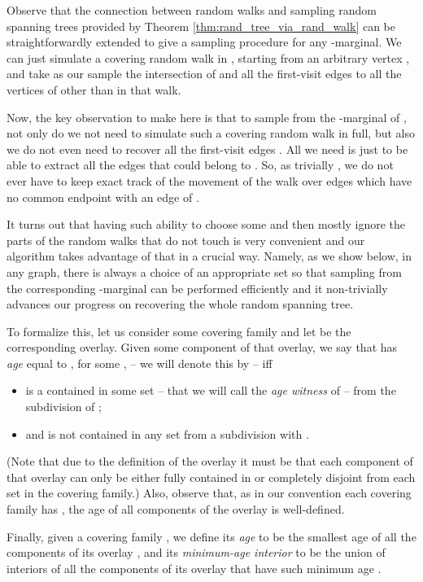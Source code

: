 \documentclass[11pt, letterpaper]{article}
\begin{document}
Observe that the connection between random walks and sampling random spanning trees provided by Theorem \ref{thm:rand_tree_via_rand_walk} can be straightforwardly extended to give a sampling procedure for any -marginal. We can just simulate a covering random walk  in , starting from an arbitrary vertex , and take as our sample the intersection  of  and all the first-visit edges  to all the vertices of  other than  in that walk. 

Now, the key observation to make here is that to sample from the -marginal of , not only do we not need to simulate such a covering random walk  in full, but also we do not even need to recover all the first-visit edges . All we need is just to be able to extract all the edges  that could belong to . So, as trivially , we do not ever have to keep exact track of the movement of the walk  over edges which have no common endpoint with an edge of .

It turns out that having such ability to choose some  and then mostly ignore the parts of the random walks that do not touch  is very convenient and our algorithm takes advantage of that in a crucial way. Namely, as we show below, in any graph, there is always a choice of an appropriate set  so that sampling from the corresponding -marginal can be performed efficiently and it non-trivially advances our progress on recovering the whole random spanning tree.

To formalize this, let us consider some covering family  and let  be the corresponding overlay. Given some component  of that overlay, we say that  has {\em age} equal to , for some , -- we will denote this by  -- iff
\begin{itemize}\addtolength{\itemsep}{-.5\baselineskip}
\item  is a contained in some set  -- that we will call the {\em age witness } of  -- from the subdivision  of ;
\item and  is not contained in any set  from a subdivision  with .
\end{itemize}
(Note that due to the definition of the overlay it must be that each component  of that overlay can only be either fully contained in or completely disjoint from each set  in the covering family.) Also, observe that, as in our convention each covering family has , the age of all components of the overlay is well-defined. 

Finally, given a covering family , we define its {\em age}  to be the smallest age of all the components of its overlay , and its {\em minimum-age interior}  to be the union of interiors  of all the components of its overlay  that have such minimum age .  
\end{document}
